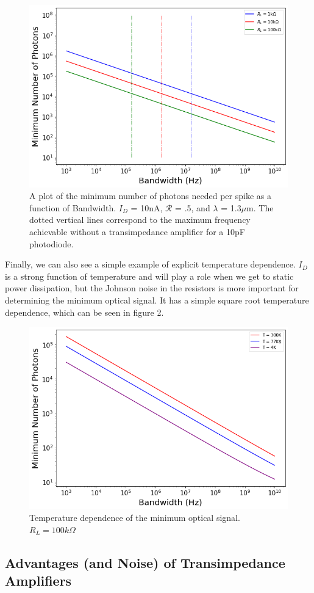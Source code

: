 \documentclass[12pt]{article}
\begin{document}
\begin{figure}
    \centering
    \includegraphics[width=15cm]{photon_V_BW.png}
    \caption{A plot of the minimum number of photons needed per spike as a function of Bandwidth. $I_D$ = 10nA, $\mathcal{R}$ = .5, and $\lambda$ = 1.3$\mu$m. The dotted vertical lines correspond to the maximum frequency achievable without a transimpedance amplifier for a 10pF photodiode. }
    \label{fig:my_label}
\end{figure}

Finally, we can also see a simple example of explicit temperature dependence. $I_D$ is a strong function of temperature and will play a role when we get to static power dissipation, but the Johnson noise in the resistors is more important for determining the minimum optical signal. It has a simple square root temperature dependence, which can be seen in figure 2.

\begin{figure}
    \centering
    \includegraphics[width=15cm]{Temp_Photon_spike.png}
    \caption{Temperature dependence of the minimum optical signal. $R_L = 100k\Omega$}
    \label{fig:my_label}
\end{figure}

\subsection{Advantages (and Noise) of Transimpedance Amplifiers}
\end{document}
